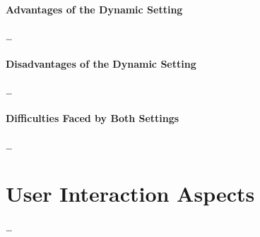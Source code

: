 \paragraph{Advantages of the Dynamic Setting}

\dots

\paragraph{Disadvantages of the Dynamic Setting}

\dots

\paragraph{Difficulties Faced by Both Settings}

\dots



\section{User Interaction Aspects}
\label{sec:user_interaction}

\dots



